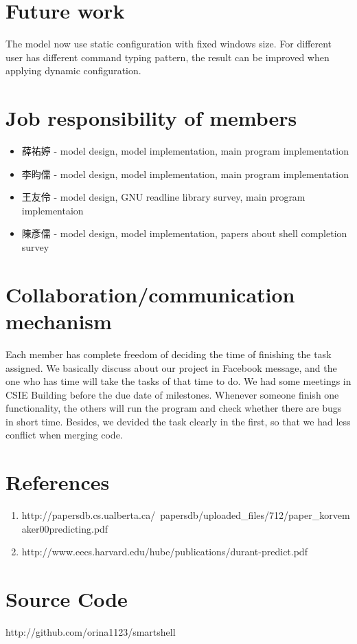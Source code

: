 \documentclass[11pt,a4paper]{article}
\begin{document}
\section*{Future work}

The model now use static configuration with fixed windows size.
For different user has different command typing pattern, 
the result can be improved when applying dynamic configuration.

\section*{Job responsibility of members}

\begin{CJK}{UTF8}{bsmi}
\begin{itemize}
\item 薛祐婷 - model design, model implementation, main program implementation
\item 李昀儒 - model design, model implementation, main program implementation
\item 王友伶 - model design, GNU readline library survey, main program implementaion
\item 陳彥儒 - model design, model implementation, papers about shell completion survey
\end{itemize}
\end{CJK}

\section*{Collaboration/communication mechanism}
Each member has complete freedom of deciding the time of finishing the task assigned.
We basically discuss about our project in Facebook message, 
and the one who has time will take the tasks of that time to do.
We had some meetings in CSIE Building before the due date of milestones. 
Whenever someone finish one functionality, 
the others will run the program and check whether there are bugs in short time.
Besides, we devided the task clearly in the first, 
so that we had less conflict when merging code.

\section*{References}
\begin{enumerate}
\item http://papersdb.cs.ualberta.ca/~papersdb/uploaded\_files/712/paper\_korvemaker00predicting.pdf
\item http://www.eecs.harvard.edu/hube/publications/durant-predict.pdf
\end{enumerate}

\section*{Source Code}
http://github.com/orina1123/smartshell




\end{document}
